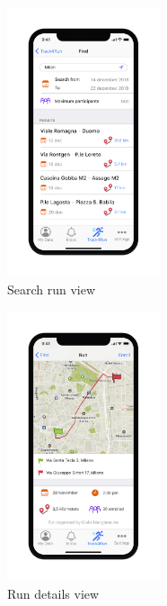 \begin{figure}[H]
	\centering
	\includegraphics[width=0.4\textwidth]{./Pictures/Mockup/mobile/search_run.png}
	\captionsetup{skip=0pt}
	\caption{Search run view}
\end{figure}

\begin{figure}[H]
	\centering
	\includegraphics[width=0.4\textwidth]{./Pictures/Mockup/mobile/view_run.png}
	\captionsetup{skip=0pt}
	\caption{Run details view}
\end{figure}

